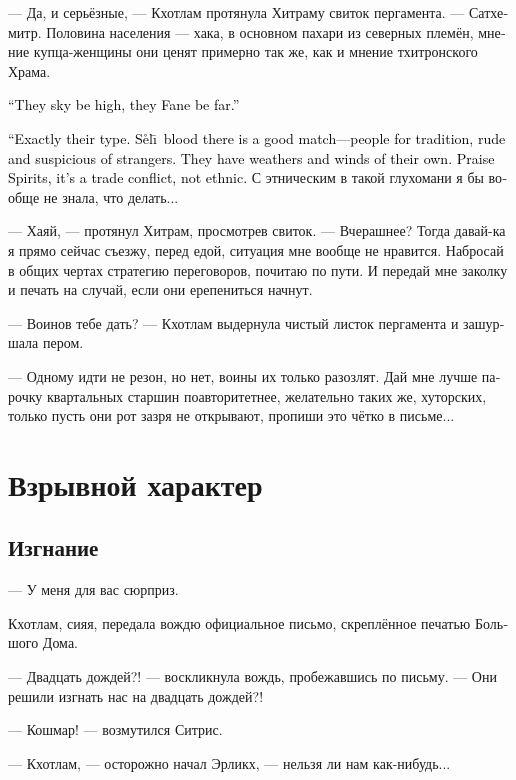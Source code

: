 \documentclass[a4paper,12pt,fleqn]{book}\usepackage{cooltooltips}\usepackage{polyglossia}\setdefaultlanguage{russian}\setotherlanguage{english}\defaultfontfeatures{Ligatures=TeX,Mapping=tex-text} \usepackage{xcolor}\definecolor{lightgray}{HTML}{bbbbbb}\color{lightgray}\newcommand{\ml}[3]{\textenglish{\textcolor{black}{#3}}}
\newcommand{\Seli}{S\r{e}l\={\i}}
\begin{document}
--- Да, и серьёзные, --- Кхотлам протянула Хитраму свиток пергамента.
--- Сатхемитр.
Половина населения --- хака, в основном пахари из северных племён, мнение купца-женщины они ценят примерно так же, как и мнение тхитронского Храма.

\ml{$0$}
{--- Небо высоко, Храм далеко.}
{``They sky be high, they Fane be far.''}

\ml{$0$}
{--- Вот именно такие.}
{``Exactly their type.}
\ml{$0$}
{Те, что сели, под стать --- ревнители старины, грубые и подозрительные к чужакам.}
{\Seli\ blood there is a good match---people for tradition, rude and suspicious of strangers.}
\ml{$0$}
{У них своя погода и свои ветра.}
{They have weathers and winds of their own.}
\ml{$0$}
{Слава духам, конфликт не этнический, а торговый.}
{Praise Spirits, it's a trade conflict, not ethnic.}
С этническим в такой глухомани я бы вообще не знала, что делать...

--- Хаяй, --- протянул Хитрам, просмотрев свиток.
--- Вчерашнее?
Тогда давай-ка я прямо сейчас съезжу, перед едой, ситуация мне вообще не нравится.
Набросай в общих чертах стратегию переговоров, почитаю по пути.
И передай мне заколку и печать на случай, если они ерепениться начнут.

--- Воинов тебе дать? --- Кхотлам выдернула чистый листок пергамента и зашуршала пером.

--- Одному идти не резон, но нет, воины их только разозлят.
Дай мне лучше парочку квартальных старшин поавторитетнее, желательно таких же, хуторских, только пусть они рот зазря не открывают, пропиши это чётко в письме...

\chapter{Взрывной характер}

\section{Изгнание}

--- У меня для вас сюрприз.

Кхотлам, сияя, передала вождю официальное письмо, скреплённое печатью Большого Дома.

--- Двадцать дождей?! --- воскликнула вождь, пробежавшись по письму.
--- Они решили изгнать нас на двадцать дождей?!

--- Кошмар! --- возмутился Ситрис.

--- Кхотлам, --- осторожно начал Эрликх, --- нельзя ли нам как-нибудь...
\end{document}
